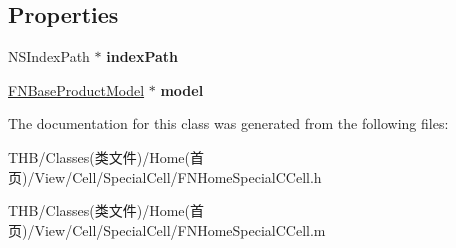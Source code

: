 \subsection*{Properties}
\begin{DoxyCompactItemize}
\item 
\mbox{\label{interface_f_n_home_special_c_cell_a42ce54f608f6519ff25b83a771b46bce}} 
N\+S\+Index\+Path $\ast$ {\bfseries index\+Path}
\item 
\mbox{\label{interface_f_n_home_special_c_cell_abd1b4876374bec36e33426cd598ea25a}} 
\mbox{\hyperlink{interface_f_n_base_product_model}{F\+N\+Base\+Product\+Model}} $\ast$ {\bfseries model}
\end{DoxyCompactItemize}


The documentation for this class was generated from the following files\+:\begin{DoxyCompactItemize}
\item 
T\+H\+B/\+Classes(类文件)/\+Home(首页)/\+View/\+Cell/\+Special\+Cell/F\+N\+Home\+Special\+C\+Cell.\+h\item 
T\+H\+B/\+Classes(类文件)/\+Home(首页)/\+View/\+Cell/\+Special\+Cell/F\+N\+Home\+Special\+C\+Cell.\+m\end{DoxyCompactItemize}
